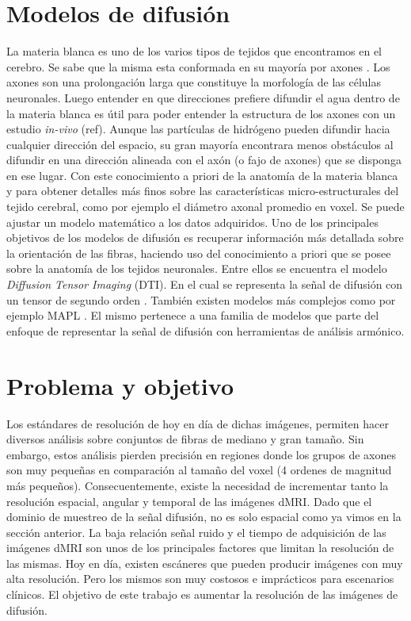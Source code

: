 \section{Modelos de difusi\'on}
La materia blanca es uno de los varios tipos de tejidos que encontramos en el cerebro. Se sabe que 
la misma esta conformada en su mayor\'ia por axones \citep{Purves2004}. Los axones son una 
prolongaci\'on larga que constituye la morfolog\'ia de las c\'elulas neuronales. 
Luego entender en que direcciones prefiere difundir el agua dentro de la materia 
blanca es \'util para poder entender la estructura de los axones con un estudio \textit{in-vivo} 
(ref). Aunque las part\'iculas de hidr\'ogeno pueden difundir hacia cualquier 
direcci\'on del espacio, su gran mayor\'ia encontrara menos obst\'aculos al difundir en una 
direcci\'on alineada con el ax\'on (o fajo de axones) que se disponga en ese lugar. Con este 
conocimiento a priori de la anatomía de la materia blanca y para obtener detalles más finos sobre 
las características micro-estructurales del tejido cerebral, como por ejemplo el diámetro axonal 
promedio en voxel. Se puede ajustar un modelo matemático a los datos adquiridos. Uno de los 
principales objetivos de los modelos de difusión es recuperar información más detallada sobre la 
orientación de las fibras, haciendo uso del conocimiento a priori que se posee sobre la anatomía de 
los tejidos neuronales. Entre ellos se encuentra el modelo \textit{Diffusion Tensor Imaging} (DTI). 
En el cual se representa la se\~nal de difusión con un tensor de segundo orden \citep{Basser1994}. 
También existen modelos más complejos como por ejemplo MAPL \citep{Fick2016365}. El mismo pertenece 
a una familia de modelos que parte del enfoque de representar la señal de difusión con 
herramientas de análisis armónico.

\section{Problema y objetivo}
Los estándares de resolución de hoy en día de dichas imágenes, permiten hacer diversos análisis sobre conjuntos de 
fibras de mediano y gran tamaño. Sin embargo, estos análisis pierden precisión en regiones donde los grupos de axones 
son muy pequeñas en comparación al tamaño del voxel (4 ordenes de magnitud más pequeños). Consecuentemente, existe la 
necesidad de incrementar tanto la resolución espacial, angular y temporal de las imágenes dMRI. Dado que el dominio de 
muestreo de la señal difusión, no es solo espacial como ya vimos en la sección anterior. La baja relación señal ruido y el tiempo de adquisición de las 
imágenes dMRI son unos de los principales factores que limitan la resolución de las mismas. %
Hoy en día, existen escáneres que pueden producir imágenes con muy alta resolución. Pero los mismos son muy costosos e 
imprácticos para escenarios clínicos. El objetivo de este trabajo es aumentar la resolución de las imágenes de difusión.


